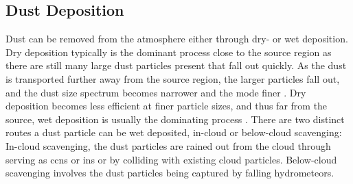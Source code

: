\subsection{Dust Deposition}
Dust can be removed from the atmosphere either through dry- or wet deposition. 
Dry deposition typically is the dominant process close to the source region as there are still many large dust particles present that fall out quickly. 
As the dust is transported further away from the source region, the larger particles fall out, and the dust size spectrum becomes narrower and the mode finer \parencite{does2016particle}.
Dry deposition becomes less efficient at finer particle sizes, and thus far from the source, wet deposition is usually the dominating process \parencite{zhao2003modeled}.
There are two distinct routes a dust particle can be wet deposited, in-cloud or below-cloud scavenging: 
In-cloud scavenging, the dust particles are rained out from the cloud through serving as \acrshort{ccn}s or \acrshort{in}s or by colliding with existing cloud particles. Below-cloud scavenging involves the dust particles being captured by falling hydrometeors. 

